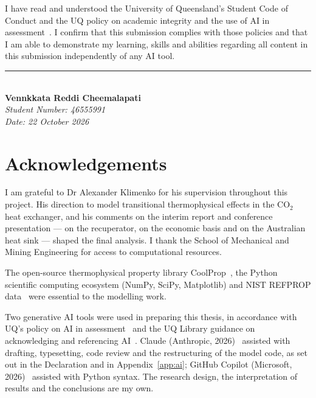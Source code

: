 \bigskip
\noindent I have read and understood the University of Queensland's Student
Code of Conduct and the UQ policy on academic integrity and the use of AI in
assessment~\cite{UQ2026AI}. I confirm that this submission complies with
those policies and that I am able to demonstrate my learning, skills and
abilities regarding all content in this submission independently of any AI
tool.

\bigskip\bigskip\bigskip
\noindent\rule{7cm}{0.4pt}\\[0.2cm]
\textbf{Vennkkata Reddi Cheemalapati}\\
\textit{Student Number: 46555991}\\
\textit{Date: 22 October 2026}
\clearpage

\chapter*{Acknowledgements}
I am grateful to Dr Alexander Klimenko for his supervision throughout this
project. His direction to model transitional thermophysical effects in the
CO$_2$ heat exchanger, and his comments on the interim report and conference
presentation --- on the recuperator, on the economic basis and on the
Australian heat sink --- shaped the final analysis. I thank the School of
Mechanical and Mining Engineering for access to computational resources.

The open-source thermophysical property library CoolProp~\cite{Bell2014},
the Python scientific computing ecosystem (NumPy, SciPy, Matplotlib) and
NIST REFPROP data~\cite{Lemmon2018} were essential to the modelling work.

Two generative AI tools were used in preparing this thesis, in accordance
with UQ's policy on AI in assessment~\cite{UQ2026AI} and the UQ Library
guidance on acknowledging and referencing AI~\cite{UQLib2026}. Claude
(Anthropic, 2026)~\cite{Anthropic2026} assisted with drafting, typesetting,
code review and the restructuring of the model code, as set out in the
Declaration and in Appendix~\ref{app:ai}; GitHub Copilot (Microsoft,
2026)~\cite{GitHubCopilot2026} assisted with Python syntax. The research
design, the interpretation of results and the conclusions are my own.
\clearpage
